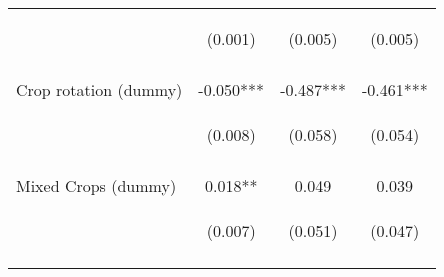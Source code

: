 \begin{center}
\begin{tabular}{lccc}
 & \begin{footnotesize}(0.001)\end{footnotesize} & \begin{footnotesize}(0.005)\end{footnotesize} & \begin{footnotesize}(0.005)\end{footnotesize} \\
\vspace{4pt} & \begin{footnotesize}[0.000]\end{footnotesize} & \begin{footnotesize}[0.000]\end{footnotesize} & \begin{footnotesize}[0.000]\end{footnotesize} \\
Crop rotation (dummy) & -0.050*** & -0.487*** & -0.461*** \\
 & \begin{footnotesize}(0.008)\end{footnotesize} & \begin{footnotesize}(0.058)\end{footnotesize} & \begin{footnotesize}(0.054)\end{footnotesize} \\
\vspace{4pt} & \begin{footnotesize}[0.000]\end{footnotesize} & \begin{footnotesize}[0.000]\end{footnotesize} & \begin{footnotesize}[0.000]\end{footnotesize} \\
Mixed Crops (dummy) & 0.018** & 0.049 & 0.039 \\
 & \begin{footnotesize}(0.007)\end{footnotesize} & \begin{footnotesize}(0.051)\end{footnotesize} & \begin{footnotesize}(0.047)\end{footnotesize} \\
\vspace{4pt} & \begin{footnotesize}[0.016]\end{footnotesize} & \begin{footnotesize}[0.343]\end{footnotesize} & \begin{footnotesize}[0.410]\end{footnotesize} \\

\end{tabular}
\end{center}
